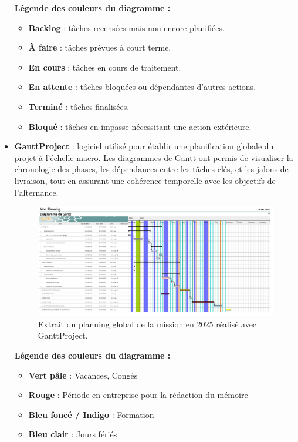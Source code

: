 \documentclass[11pt,a4paper]{article}
\begin{document}
\begin{itemize}
   \vspace{0.5em}
    \begin{flushleft}
    \textbf{Légende des couleurs du diagramme :}
	\begin{itemize}[label=--]
    		\item \textbf{Backlog} : tâches recensées mais non encore planifiées.
    		\item \textbf{À faire} : tâches prévues à court terme.
    		\item \textbf{En cours} : tâches en cours de traitement.
    		\item \textbf{En attente} : tâches bloquées ou dépendantes d'autres actions.
    		\item \textbf{Terminé} : tâches finalisées.
    		\item \textbf{Bloqué} : tâches en impasse nécessitant une action extérieure.
	\end{itemize}
    \end{flushleft}


    \item \textbf{GanttProject} : logiciel utilisé pour établir une planification globale du projet à l’échelle macro. Les diagrammes de Gantt ont permis de visualiser la chronologie des phases, les dépendances entre les tâches clés, et les jalons de livraison, tout en assurant une cohérence temporelle avec les objectifs de l’alternance.
    
\begin{figure}[H]
    \centering
    \includegraphics[width=\textwidth]{../Images/planning-2.png}
    \caption{Extrait du planning global de la mission en 2025 réalisé avec GanttProject.}
\end{figure}

   \vspace{0.5em}
    \begin{flushleft}
    \textbf{Légende des couleurs du diagramme :}
    \begin{itemize}
        \item \textcolor[HTML]{C6EFCE}{\textbf{Vert pâle}} : Vacances, Congés
        \item \textcolor[HTML]{FF0000}{\textbf{Rouge}} : Période en entreprise pour la rédaction du mémoire
        \item \textcolor[HTML]{002060}{\textbf{Bleu foncé / Indigo}} : Formation
        \item \textcolor[HTML]{DAE8FC}{\textbf{Bleu clair}} : Jours fériés
    \end{itemize}
    \end{flushleft}
    

\end{itemize}
\end{document}
